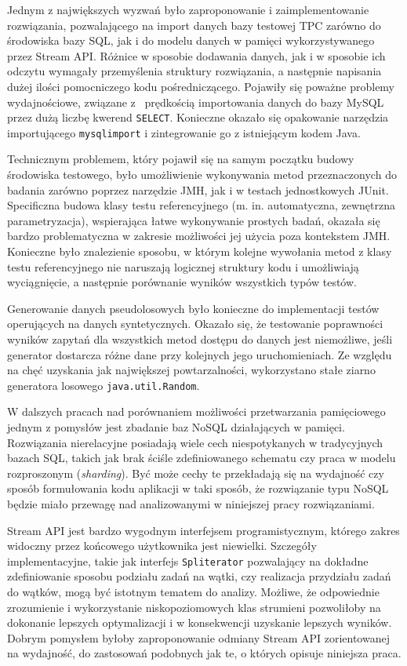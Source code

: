 \documentclass[12pt,twoside,openright]{extarticle}
\begin{document}
    Jednym z największych wyzwań było zaproponowanie i zaimplementowanie rozwiązania, pozwalającego na import danych bazy testowej TPC zarówno do środowiska bazy SQL, jak i do modelu danych w pamięci wykorzystywanego przez Stream API. Różnice w sposobie dodawania danych, jak i w sposobie ich odczytu wymagały przemyślenia struktury rozwiązania, a następnie napisania dużej ilości pomocniczego kodu pośredniczącego. Pojawiły się poważne problemy wydajnościowe, związane z~ prędkością importowania danych do bazy MySQL przez dużą liczbę kwerend \texttt{SELECT}. Konieczne okazało się opakowanie narzędzia importującego \texttt{mysqlimport} i zintegrowanie go z istniejącym kodem Java.

    Technicznym problemem, który pojawił się na samym początku budowy środowiska testowego, było umożliwienie wykonywania metod przeznaczonych do badania zarówno poprzez narzędzie JMH, jak i w testach jednostkowych JUnit. Specificzna budowa klasy testu referencyjnego (m. in. automatyczna, zewnętrzna parametryzacja), wspierająca łatwe wykonywanie prostych badań, okazała się bardzo problematyczna w zakresie możliwości jej użycia poza kontekstem JMH. Konieczne było znalezienie sposobu, w którym kolejne wywołania metod z klasy testu referencyjnego nie naruszają logicznej struktury kodu i umożliwiają wyciągnięcie, a następnie porównanie wyników wszystkich typów testów.

    Generowanie danych pseudolosowych było konieczne do implementacji testów operujących na danych syntetycznych. Okazało się, że testowanie poprawności wyników zapytań dla wszystkich metod dostępu do danych jest niemożliwe, jeśli generator dostarcza różne dane przy kolejnych jego uruchomieniach. Ze względu na chęć uzyskania jak największej powtarzalności, wykorzystano stałe ziarno generatora losowego \texttt{java.util.Random}.


    W dalszych pracach nad porównaniem możliwości przetwarzania pamięciowego jednym z pomysłów jest zbadanie baz NoSQL działających w pamięci. Rozwiązania nierelacyjne posiadają wiele cech niespotykanych w tradycyjnych bazach SQL, takich jak brak ściśle zdefiniowanego schematu czy praca w modelu rozproszonym (\textit{sharding}). Być może cechy te przekładają się na wydajność czy sposób formułowania kodu aplikacji w taki sposób, że rozwiązanie typu NoSQL będzie miało przewagę nad analizowanymi w niniejszej pracy rozwiązaniami.

    Stream API jest bardzo wygodnym interfejsem programistycznym, którego zakres widoczny przez końcowego użytkownika jest niewielki. Szczegóły implementacyjne, takie jak interfejs \texttt{Spliterator} pozwalający na dokładne zdefiniowanie sposobu podziału zadań na wątki, czy realizacja przydziału zadań do wątków, mogą być istotnym tematem do analizy. Możliwe, że odpowiednie zrozumienie i wykorzystanie niskopoziomowych klas strumieni pozwoliłoby na dokonanie lepszych optymalizacji i w konsekwencji uzyskanie lepszych wyników. Dobrym pomysłem byłoby zaproponowanie odmiany Stream API zorientowanej na wydajność, do zastosowań podobnych jak te, o których opisuje niniejsza praca.
\end{document}
